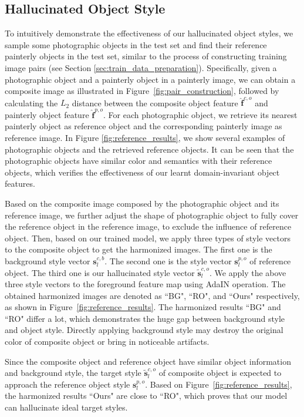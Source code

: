 \documentclass[letterpaper]{article} %
\begin{document}
\subsection{Hallucinated Object Style}
To intuitively demonstrate the effectiveness of our hallucinated object styles, we sample some photographic objects in the test set and find their reference painterly objects in the test set, similar to the process of constructing training image pairs (see Section \ref{sec:train_data_preparation}). Specifically, given a photographic object and a painterly object in a painterly image, we can obtain a composite image as illustrated in Figure~\ref{fig:pair_construction}, followed by calculating the $L_2$ distance between the composite object feature $\hat{\bm{f}}^{c,o}$ and painterly object feature $\hat{\bm{f}}^{p,o}$. For each photographic object, we retrieve its nearest painterly object as reference object and the corresponding painterly image as reference image. In Figure \ref{fig:reference_results}, we show several examples of photographic objects and the retrieved reference objects. It can be seen that the photographic objects have similar color and semantics with their reference objects, which verifies the effectiveness of our learnt domain-invariant object features. %

Based on the composite image composed by the photographic object and its reference image, we further adjust the shape of photographic object to fully cover the reference object in the reference image, to exclude the influence of reference object. Then, based on our trained model, we apply three types of style vectors to the composite object to get the harmonized images.
The first one is the background style vector $\bm{s}_l^{c,b}$. The second one is the style vector $\bm{s}_l^{p,o}$ of reference object. The third one is our hallucinated style vector $\tilde{\bm{s}}_l^{c,o}$. We apply the above three style vectors to the foreground feature map using AdaIN operation. The obtained harmonized images are denoted as ``BG", ``RO", and ``Ours" respectively, as shown in Figure~\ref{fig:reference_results}.
The harmonized results ``BG" and ``RO" differ a lot, which demonstrates the huge gap between background style and object style. Directly applying background style may destroy the original color of composite object or bring in noticeable artifacts.

Since the composite object and reference object have similar object information and background style, the target style $\tilde{\bm{s}}_l^{c,o}$ of composite object is expected to approach the reference object style $\bm{s}_l^{p,o}$. Based on Figure~\ref{fig:reference_results},  the harmonized results ``Ours" are close to ``RO", which proves that our model can hallucinate ideal target styles.
\end{document}
